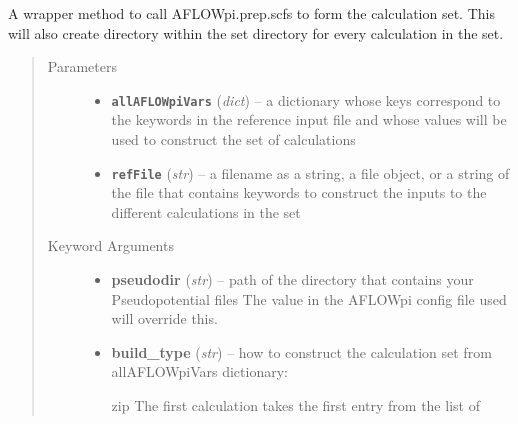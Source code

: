 \documentclass[letterpaper,10pt,english]{sphinxmanual}
\begin{document}
\begin{fulllineitems}

\begin{fulllineitems}
\label{prep:prep.init.scfs}
A wrapper method to call AFLOWpi.prep.scfs to form the calculation set. This will
also create directory within the set directory for every calculation in the set.
\begin{quote}\begin{description}
\item[{Parameters}] \leavevmode\begin{itemize}
\item {} 
\textbf{\texttt{allAFLOWpiVars}} (\emph{dict}) -- a dictionary whose keys correspond to the keywords in the
reference input file and whose values will be used to
construct the set of calculations

\item {} 
\textbf{\texttt{refFile}} (\emph{str}) -- a filename as a string, a file object, or a string of the file
that contains keywords to construct the inputs to the different
calculations in the set

\end{itemize}

\item[{Keyword Arguments}] \leavevmode\begin{itemize}
\item {} 
\textbf{pseudodir} (\emph{str}) --
path of the directory that contains your Pseudopotential files
The value in the AFLOWpi config file used will override this.

\item {} 
\textbf{build\_type} (\emph{str}) --
how to construct the calculation set from allAFLOWpiVars dictionary:
\begin{description}
\item[{zip \textbar{} The first calculation takes the first entry from the list of}] \leavevmode
{}


\end{description}
\end{itemize}
\end{description}
\end{quote}
\end{fulllineitems}
\end{fulllineitems}
\end{document}

